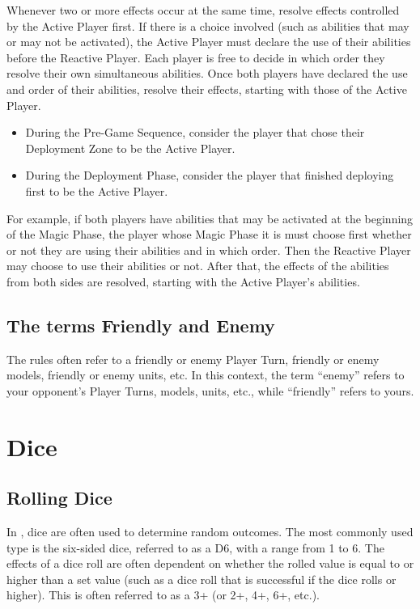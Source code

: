 Whenever two or more effects occur at the same time, resolve effects controlled by the Active Player first. If there is a choice involved (such as abilities that may or may not be activated), the Active Player must declare the use of their abilities before the Reactive Player. Each player is free to decide in which order they resolve their own simultaneous abilities. Once both players have declared the use and order of their abilities, resolve their effects, starting with those of the Active Player.

\begin{itemize}
\item During the Pre-Game Sequence, consider the player that chose their Deployment Zone to be the Active Player.
\item During the Deployment Phase, consider the player that finished deploying first to be the Active Player.
\end{itemize}

For example, if both players have abilities that may be activated at the beginning of the Magic Phase, the player whose Magic Phase it is must choose first whether or not they are using their abilities and in which order. Then the Reactive Player may choose to use their abilities or not. After that, the effects of the abilities from both sides are resolved, starting with the Active Player's abilities.

\subsection{The terms Friendly and Enemy}

The rules often refer to a friendly or enemy Player Turn, friendly or enemy models, friendly or enemy units, etc. In this context, the term \enquote{enemy} refers to your opponent's Player Turns, models, units, etc., while \enquote{friendly} refers to yours.

\section{Dice}
\label{dice}

\subsection{Rolling Dice}
\label{rolling_dice}

In \nameofthegame{}, dice are often used to determine random outcomes. The most commonly used type is the six-sided dice, referred to as a D6, with a range from 1 to 6. The effects of a dice roll are often dependent on whether the rolled value is equal to or higher than a set value (such as a dice roll that is successful if the dice rolls  or higher). This is often referred to as a 3+ (or 2+, 4+, 6+, etc.).

